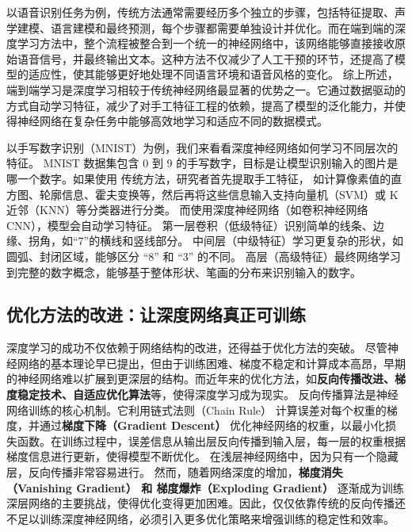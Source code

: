 以语音识别任务为例，传统方法通常需要经历多个独立的步骤，包括特征提取、声学建模、语言建模和最终预测，每个步骤都需要单独设计并优化。而在端到端的深度学习方法中，整个流程被整合到一个统一的神经网络中，该网络能够直接接收原始语音信号，并最终输出文本。这种方法不仅减少了人工干预的环节，还提高了模型的适应性，使其能够更好地处理不同语言环境和语音风格的变化。
综上所述，端到端学习是深度学习相较于传统神经网络最显著的优势之一。它通过数据驱动的方式自动学习特征，减少了对手工特征工程的依赖，提高了模型的泛化能力，并使得神经网络在复杂任务中能够高效地学习和适应不同的数据模式。


以手写数字识别（MNIST）为例，我们来看看深度神经网络如何学习不同层次的特征。
MNIST 数据集包含 0 到 9 的手写数字，目标是让模型识别输入的图片是哪一个数字。如果使用 传统方法，研究者首先提取手工特征， 如计算像素值的直方图、轮廓信息、霍夫变换等，然后再将这些信息输入支持向量机（SVM）或 K 近邻（KNN）等分类器进行分类。
而使用深度神经网络（如卷积神经网络 CNN），模型会自动学习特征。
第一层卷积（低级特征）识别简单的线条、边缘、拐角，如“7”的横线和竖线部分。
中间层（中级特征）学习更复杂的形状，如圆弧、封闭区域，能够区分 “8” 和 “3” 的不同。
高层（高级特征）最终网络学习到完整的数字概念，能够基于整体形状、笔画的分布来识别输入的数字。

\subsection{优化方法的改进：让深度网络真正可训练}


深度学习的成功不仅依赖于网络结构的改进，还得益于优化方法的突破。
尽管神经网络的基本理论早已提出，但由于训练困难、梯度不稳定和计算成本高昂，早期的神经网络难以扩展到更深层的结构。而近年来的优化方法，如{\bf 反向传播改进、梯度稳定技术、自适应优化算法}等，使得深度学习成为现实。
反向传播算法是神经网络训练的核心机制。它利用链式法则（Chain Rule） 计算误差对每个权重的梯度，并通过{\bf 梯度下降（Gradient Descent）} 优化神经网络的权重，以最小化损失函数。在训练过程中，误差信息从输出层反向传播到输入层，每一层的权重根据梯度信息进行更新，使得模型不断优化。
在浅层神经网络中，因为只有一个隐藏层，反向传播非常容易进行。
然而，随着网络深度的增加，{\bf 梯度消失（Vanishing Gradient） 和 梯度爆炸（Exploding Gradient）} 逐渐成为训练深层网络的主要挑战，使得优化变得更加困难。因此，仅仅依靠传统的反向传播还不足以训练深度神经网络，必须引入更多优化策略来增强训练的稳定性和效率。

